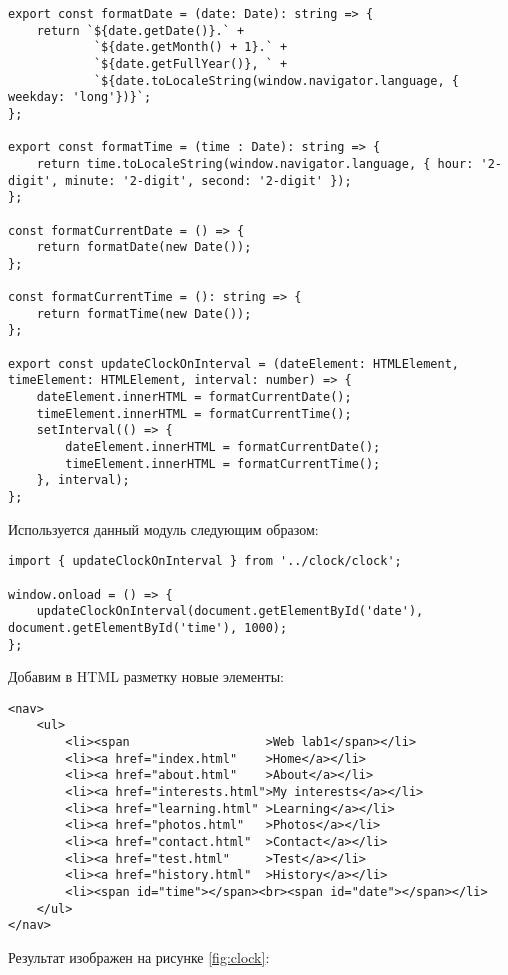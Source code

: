 \documentclass[a4paper,14pt]{extarticle}
\begin{document}
\begin{lstlisting}
export const formatDate = (date: Date): string => {
    return `${date.getDate()}.` +
            `${date.getMonth() + 1}.` +
            `${date.getFullYear()}, ` +
            `${date.toLocaleString(window.navigator.language, { weekday: 'long'})}`;
};

export const formatTime = (time : Date): string => {
    return time.toLocaleString(window.navigator.language, { hour: '2-digit', minute: '2-digit', second: '2-digit' });
};

const formatCurrentDate = () => {
    return formatDate(new Date());
};

const formatCurrentTime = (): string => {
    return formatTime(new Date());
};

export const updateClockOnInterval = (dateElement: HTMLElement, timeElement: HTMLElement, interval: number) => {
    dateElement.innerHTML = formatCurrentDate();
    timeElement.innerHTML = formatCurrentTime();
    setInterval(() => {
        dateElement.innerHTML = formatCurrentDate();
        timeElement.innerHTML = formatCurrentTime();
    }, interval);
};
\end{lstlisting}

Используется данный модуль следующим образом:

\begin{lstlisting}
import { updateClockOnInterval } from '../clock/clock';

window.onload = () => {
    updateClockOnInterval(document.getElementById('date'), document.getElementById('time'), 1000);
};
\end{lstlisting}

Добавим в HTML разметку новые элементы:

\begin{lstlisting}
<nav>
    <ul>
        <li><span                   >Web lab1</span></li>
        <li><a href="index.html"    >Home</a></li>
        <li><a href="about.html"    >About</a></li>
        <li><a href="interests.html">My interests</a></li>
        <li><a href="learning.html" >Learning</a></li>
        <li><a href="photos.html"   >Photos</a></li>
        <li><a href="contact.html"  >Contact</a></li>
        <li><a href="test.html"     >Test</a></li>
        <li><a href="history.html"  >History</a></li>
        <li><span id="time"></span><br><span id="date"></span></li>
    </ul>
</nav>
\end{lstlisting}

Результат изображен на рисунке \ref{fig:clock}:
\end{document}
